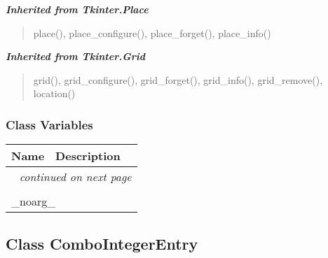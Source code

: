 \large{\textbf{\textit{Inherited from Tkinter.Place}}}

\begin{quote}
place(), place\_configure(), place\_forget(), place\_info()
\end{quote}

\large{\textbf{\textit{Inherited from Tkinter.Grid}}}

\begin{quote}
grid(), grid\_configure(), grid\_forget(), grid\_info(), grid\_remove(), location()
\end{quote}


  \subsubsection{Class Variables}

    \vspace{-1cm}
\hspace{\varindent}\begin{longtable}{|p{\varnamewidth}|p{\vardescrwidth}|l}
\cline{1-2}
\cline{1-2} \centering \textbf{Name} & \centering \textbf{Description}& \\
\cline{1-2}
\endhead\cline{1-2}\multicolumn{3}{r}{\small\textit{continued on next page}}\\\endfoot\cline{1-2}
\endlastfoot\multicolumn{2}{|l|}{\textit{Inherited from Tkinter.Misc}}\\
\multicolumn{2}{|p{\varwidth}|}{\raggedright \_noarg\_}\\
\cline{1-2}
\end{longtable}



\subsection{Class ComboIntegerEntry}

